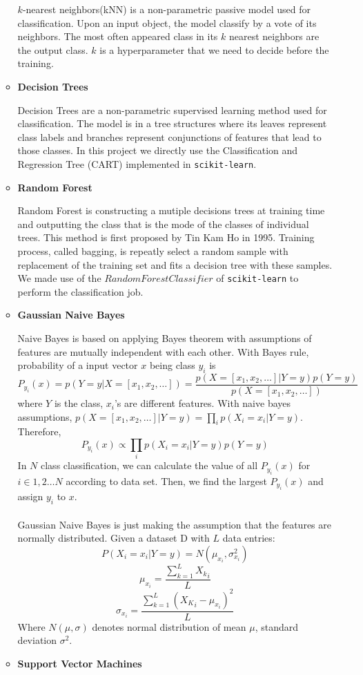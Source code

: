 \documentclass[11.5pt]{article}
\begin{document}
\begin{enumerate}
\begin{itemize}
                $k$-nearest neighbors(kNN) is a non-parametric passive model used for classification. Upon an input object, the model classify by a vote of its neighbors. The most often appeared class in its $k$ nearest neighbors are the output class. $k$ is a hyperparameter that we need to decide before the training.
                \item \textbf{Decision Trees}
                
                Decision Trees are a non-parametric supervised learning method used for classification. The model is in a tree structures where its leaves represent class labels and branches represent conjunctions of features that lead to those classes. In this project we directly use the Classification and Regression Tree (CART) implemented in \texttt{scikit-learn}\cite{scikit-learn}.
                \item \textbf{Random Forest}
                
                Random Forest is constructing a mutiple decisions trees at training time and outputting the class that is the mode of the classes of individual trees. This method is first proposed by Tin Kam Ho in 1995\cite{random_forest}. Training process, called bagging\cite{rf_bagging}, is repeatly select a random sample with replacement of the training set and fits a decision tree with these samples. We made use of the $RandomForestClassifier$ of \texttt{scikit-learn}\cite{scikit-learn} to perform the classification job.
                \item \textbf{Gaussian Naive Bayes}
                
                Naive Bayes is based on applying Bayes theorem with assumptions of features are mutually independent with each other. With Bayes rule, probability of a input vector $x$ being class $y_i$ is 
                $$P_{y_i}(x) = p(Y = y | X = [x_1, x_2, \dots] ) = \frac{p( X = [x_1, x_2, \dots] | Y = y)p(Y = y)}{p(X = [x_1, x_2, \dots])} $$
                where $Y$ is the class, $x_i$'s are different features. With naive bayes assumptions, $p(X = [x_1, x_2, \dots] | Y = y) = \prod_i p(X_i = x_i | Y = y)$. Therefore,
                $$P_{y_i}(x) \propto \prod_i p(X_i = x_i | Y = y)p(Y = y)$$
                In $N$ class classification, we can calculate the value of all $P_{y_i}(x)$ for $i \in 1,2 \dots N$ according to data set. Then, we find the largest $P_{y_i}(x)$ and assign $y_i$ to $x$.\\ \\
                Gaussian Naive Bayes is just making the assumption that the features are normally distributed. Given a dataset D with $L$ data entries:
                $$P(X_i = x_i | Y = y) = N(\mu_{x_i}, \sigma^2_{x_i})$$
                $$\mu_{x_i} = \frac{\sum_{k = 1}^L {X_k}_i}{L}$$
                $$\sigma_{x_i} = \frac{\sum_{k = 1}^L ({X_K}_i - \mu_{x_i})^2}{L}$$
                Where $N(\mu, \sigma)$ denotes normal distribution of mean $\mu$, standard deviation $\sigma^2$.
                \item \textbf{Support Vector Machines}
                

\end{itemize}
\end{enumerate}
\end{document}
